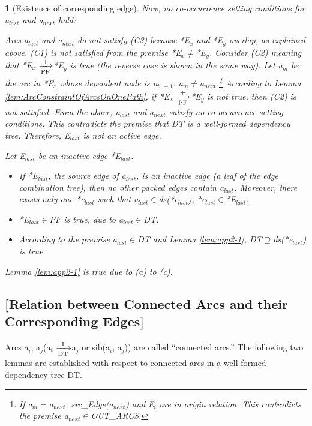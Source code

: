 \documentclass[english]{jnlp_1.4_rep}
\theoremstyle{break}
\theoremstyle{plain}
\newtheorem{lemma}{}[]
\theoremstyle{plain}
\begin{document}
\begin{lemma}[Existence of corresponding edge]
{Now, no co-occurrence setting conditions for a$_{last}$ and a$_{next}$ hold:

Arcs a$_{last}$ and a$_{next}$ do not satisfy (C3) because *E$_x$ and
*E$_y$ overlap, as explained above. (C1) is not satisfied from the
premise *E$_x{\neq}$*E$_y$. Consider (C2) meaning that
*E$_x \xrightarrow[{\rm PF}]{+}$*E$_y$ is true (the reverse case is
shown in the same way). Let a$_m$ be the arc in *E$_x$ whose
dependent node is n$_{t1+1}$. a$_m\neq$a$_{next}$.\footnote{If
  a$_m =$a$_{next}$, src\_Edge(a$_{next}$) and E$_i$ are in origin
  relation. This contradicts the premise
  a$_{next}{\in}$OUT\_ARCS.} According to Lemma
\ref{lem:ArcConstraintOfArcsOnOnePath}, if *E$_x \xrightarrow[{\rm
      PF}]{+}$*E$_y$ is not true, then (C2) is not satisfied. From
the above, a$_{last}$ and a$_{next}$ satisfy no co-occurrence setting
conditions. This contradicts the premise that DT is a well-formed
dependency tree. Therefore, E$_{last}$ is not an active edge.

\noindent
Let E$_{last}$ be an inactive edge *E$_{last}$.

\begin{itemize}
\item[(a)] If *E$_{last}$, the source edge of a$_{last}$, is an inactive edge (a leaf of the edge combination tree), then no other packed edges contain a$_{last}$. Moreover, there exists only one *e$_{last}$ such that a$_{last}{\in}$ds(*e$_{last}$), *e$_{last}{\in}$*E$_{last}$.
\item[(b)] *E$_{last}{\in}$PF is true, due to a$_{last}{\in}$DT.
\item[(c)] According to the premise a$_{last}{\in}$DT and Lemma \ref{lem:app2-1}, DT$⊇$ds(*e$_{last}$) is true.
\end{itemize}

\noindent
Lemma \ref{lem:app2-1} is true due to (a) to (c). 

}

\end{lemma}



\subsection*{[Relation between Connected Arcs and their Corresponding Edges]}

Arcs a$_i$, a$_j$(a$_i\xrightarrow[{\rm DT}]{1}$a$_j$ or
sib(a$_i$, a$_j$)) are called ``connected arcs.'' The following two
lemmas are established with respect to connected arcs in a well-formed
dependency tree DT.
\end{document}
